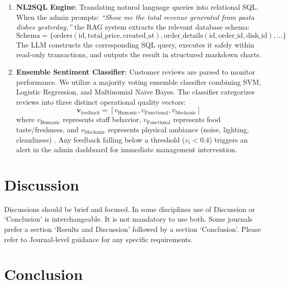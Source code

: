 \documentclass[pdflatex,sn-mathphys-num]{sn-jnl}%
\theoremstyle{thmstyleone}%
\theoremstyle{thmstyletwo}%
\theoremstyle{thmstylethree}%
\begin{document}
\begin{enumerate}
    \item \textbf{NL2SQL Engine}: Translating natural language queries into relational SQL. When the admin prompts: \textit{``Show me the total revenue generated from pasta dishes yesterday,''} the RAG system extracts the relevant database schema:
    \begin{equation}
    \text{Schema} = \{ \text{orders}(\text{id}, \text{total\_price}, \text{created\_at}), \text{order\_details}(\text{id}, \text{order\_id}, \text{dish\_id}), \dots \}
    \end{equation}
    The LLM constructs the corresponding SQL query, executes it safely within read-only transactions, and outputs the result in structured markdown charts.

    \item \textbf{Ensemble Sentiment Classifier}: Customer reviews are parsed to monitor performance. We utilize a majority voting ensemble classifier combining SVM, Logistic Regression, and Multinomial Naive Bayes. The classifier categorizes reviews into three distinct operational quality vectors:
    \begin{equation}
    \mathbf{v}_{\text{feedback}} = [v_{\text{Humanic}}, v_{\text{Functional}}, v_{\text{Mechanic}}]
    \end{equation}
    where $v_{\text{Humanic}}$ represents staff behavior, $v_{\text{Functional}}$ represents food taste/freshness, and $v_{\text{Mechanic}}$ represents physical ambiance (noise, lighting, cleanliness) \cite{art10}. Any feedback falling below a threshold ($v_i < 0.4$) triggers an alert in the admin dashboard for immediate management intervention.
\end{enumerate}

\section{Discussion}\label{sec12}

Discussions should be brief and focused. In some disciplines use of Discussion or `Conclusion' is interchangeable. It is not mandatory to use both. Some journals prefer a section `Results and Discussion' followed by a section `Conclusion'. Please refer to Journal-level guidance for any specific requirements. 

\section{Conclusion}\label{sec13}
\end{document}
